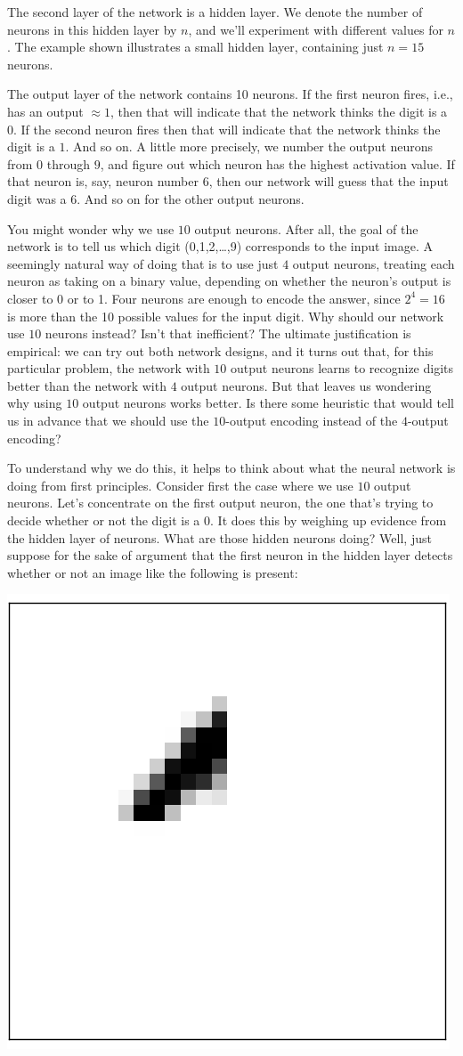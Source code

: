 \documentclass[a4paper,12pt]{report}%
\begin{document}
The second layer of the network is a hidden layer. We denote the number of neurons in this hidden layer by $n$, and we'll experiment with different values for $n$. The example shown illustrates a small hidden layer, containing just $n=15$ neurons.

The output layer of the network contains 10 neurons. If the first neuron fires, i.e., has an output $ ≈ 1 $, then that will indicate that the network thinks the digit is a $0$. If the second neuron fires then that will indicate that the network thinks the digit is a $1$. And so on. A little more precisely, we number the output neurons from $0$ through $9$, and figure out which neuron has the highest activation value. If that neuron is, say, neuron number $6$, then our network will guess that the input digit was a $6$. And so on for the other output neurons.

You might wonder why we use $10$ output neurons. After all, the goal of the network is to tell us which digit (0,1,2,…,9) corresponds to the input image. A seemingly natural way of doing that is to use just $4$ output neurons, treating each neuron as taking on a binary value, depending on whether the neuron's output is closer to 0 or to 1. Four neurons are enough to encode the answer, since $2^{4}=16$ is more than the 10 possible values for the input digit. Why should our network use $10$ neurons instead? Isn't that inefficient? The ultimate justification is empirical: we can try out both network designs, and it turns out that, for this particular problem, the network with $10$ output neurons learns to recognize digits better than the network with $4$ output neurons. But that leaves us wondering why using $10$ output neurons works better. Is there some heuristic that would tell us in advance that we should use the $10$-output encoding instead of the $4$-output encoding?

To understand why we do this, it helps to think about what the neural network is doing from first principles. Consider first the case where we use $10$ output neurons. Let's concentrate on the first output neuron, the one that's trying to decide whether or not the digit is a $0$. It does this by weighing up evidence from the hidden layer of neurons. What are those hidden neurons doing? Well, just suppose for the sake of argument that the first neuron in the hidden layer detects whether or not an image like the following is present:
\begin{center}
 \includegraphics[width=0.15\linewidth]{images/mnist_top_left_feature.png}
\end{center}
\end{document}
